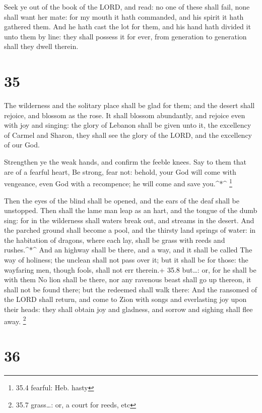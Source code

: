  Seek ye out of the book of the LORD, and read: no one of
these shall fail, none shall want her mate: for my mouth it hath
commanded, and his spirit it hath gathered them.  And he
hath cast the lot for them, and his hand hath divided it unto them by
line: they shall possess it for ever, from generation to generation
shall they dwell therein.

\hypertarget{section-34}{%
\section{35}\label{section-34}}

 The wilderness and the solitary place shall be glad for
them; and the desert shall rejoice, and blossom as the rose.
 It shall blossom abundantly, and rejoice even with joy and
singing: the glory of Lebanon shall be given unto it, the excellency of
Carmel and Sharon, they shall see the glory of the LORD, and the
excellency of our God.

 Strengthen ye the weak hands, and confirm the feeble knees.
 Say to them that are of a fearful heart, Be strong, fear
not: behold, your God will come with vengeance, even God with a
recompence; he will come and save you.\^{}*\^{} \footnote{35.4 fearful:
  Heb. hasty}

 Then the eyes of the blind shall be opened, and the ears of
the deaf shall be unstopped.  Then shall the lame man leap
as an hart, and the tongue of the dumb sing: for in the wilderness shall
waters break out, and streams in the desert.  And the
parched ground shall become a pool, and the thirsty land springs of
water: in the habitation of dragons, where each lay, shall be grass with
reeds and rushes.\^{}*\^{}  And an highway shall be there,
and a way, and it shall be called The way of holiness; the unclean shall
not pass over it; but it shall be for those: the wayfaring men, though
fools, shall not err therein.+ 35.8 but\ldots: or, for he shall be with
them  No lion shall be there, nor any ravenous beast shall
go up thereon, it shall not be found there; but the redeemed shall walk
there:  And the ransomed of the LORD shall return, and come
to Zion with songs and everlasting joy upon their heads: they shall
obtain joy and gladness, and sorrow and sighing shall flee away.
\footnote{35.7 grass\ldots: or, a court for reeds, etc}

\hypertarget{section-35}{%
\section{36}\label{section-35}}

